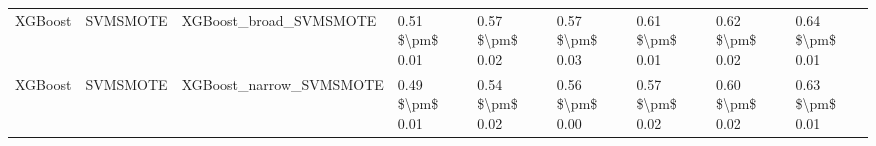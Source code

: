 \begin{tabular}{lllllllll}
                        XGBoost &                      SVMSMOTE &                       XGBoost\_broad\_SVMSMOTE & 0.51 \$\textbackslash pm\$ 0.01 &           0.57 \$\textbackslash pm\$ 0.02 &       0.57 \$\textbackslash pm\$ 0.03 &        0.61 \$\textbackslash pm\$ 0.01 &                         0.62 \$\textbackslash pm\$ 0.02 & 0.64 \$\textbackslash pm\$ 0.01 \\
                        XGBoost &                      SVMSMOTE &                      XGBoost\_narrow\_SVMSMOTE & 0.49 \$\textbackslash pm\$ 0.01 &           0.54 \$\textbackslash pm\$ 0.02 &       0.56 \$\textbackslash pm\$ 0.00 &        0.57 \$\textbackslash pm\$ 0.02 &                         0.60 \$\textbackslash pm\$ 0.02 & 0.63 \$\textbackslash pm\$ 0.01 \\
\bottomrule
\end{tabular}
